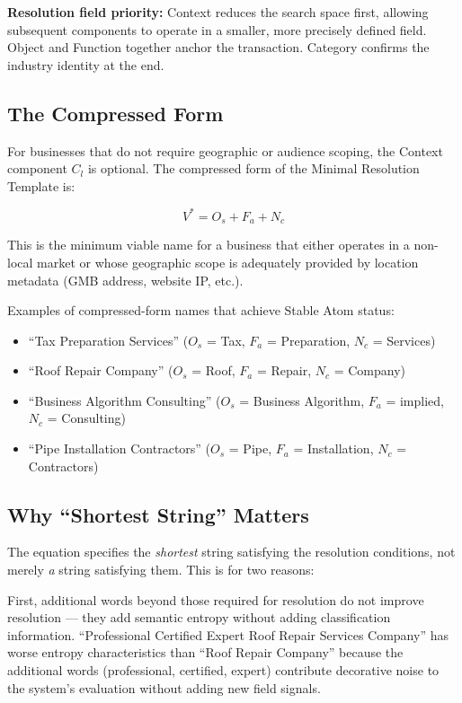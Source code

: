 \documentclass[12pt, openany]{book}
\theoremstyle{thmstyle}
\theoremstyle{defstyle}
\newcommand{\vstar}{V^{*}}
\newcommand{\Nc}{N_c}
\newcommand{\Os}{O_s}
\newcommand{\Fa}{F_a}
\newcommand{\Cl}{C_l}
\begin{document}
\textbf{Resolution field priority:} Context reduces the search space first, allowing subsequent components to operate in a smaller, more precisely defined field. Object and Function together anchor the transaction. Category confirms the industry identity at the end.

\subsection{The Compressed Form}

For businesses that do not require geographic or audience scoping, the Context component $\Cl$ is optional. The compressed form of the Minimal Resolution Template is:

\begin{equation}
\vstar = \Os + \Fa + \Nc
\label{eq:vstar_compressed}
\end{equation}

This is the minimum viable name for a business that either operates in a non-local market or whose geographic scope is adequately provided by location metadata (GMB address, website IP, etc.).

Examples of compressed-form names that achieve Stable Atom status:
\begin{itemize}[leftmargin=1.5em]
  \item ``Tax Preparation Services'' ($\Os$ = Tax, $\Fa$ = Preparation, $\Nc$ = Services)
  \item ``Roof Repair Company'' ($\Os$ = Roof, $\Fa$ = Repair, $\Nc$ = Company)
  \item ``Business Algorithm Consulting'' ($\Os$ = Business Algorithm, $\Fa$ = implied, $\Nc$ = Consulting)
  \item ``Pipe Installation Contractors'' ($\Os$ = Pipe, $\Fa$ = Installation, $\Nc$ = Contractors)
\end{itemize}

\subsection{Why ``Shortest String'' Matters}

The equation specifies the \textit{shortest} string satisfying the resolution conditions, not merely \textit{a} string satisfying them. This is for two reasons:

First, additional words beyond those required for resolution do not improve resolution --- they add semantic entropy without adding classification information. ``Professional Certified Expert Roof Repair Services Company'' has worse entropy characteristics than ``Roof Repair Company'' because the additional words (professional, certified, expert) contribute decorative noise to the system's evaluation without adding new field signals.
\end{document}
